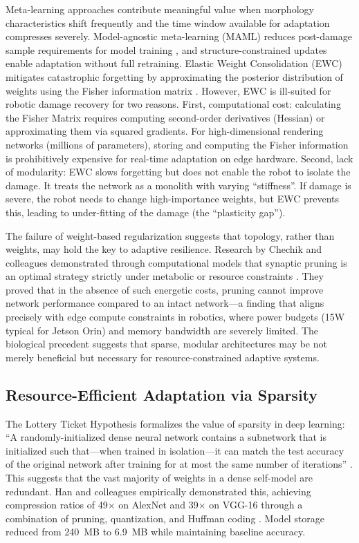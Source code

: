 \documentclass[12pt,a4paper,oneside]{report}
\begin{document}
Meta-learning approaches contribute meaningful value when morphology characteristics shift frequently and the time window available for adaptation compresses severely. Model-agnostic meta-learning (MAML) reduces post-damage sample requirements for model training \cite{finn2017maml}, and structure-constrained updates enable adaptation without full retraining. Elastic Weight Consolidation (EWC) mitigates catastrophic forgetting by approximating the posterior distribution of weights using the Fisher information matrix \cite{kirkpatrick2017overcoming}. However, EWC is ill-suited for robotic damage recovery for two reasons. First, computational cost: calculating the Fisher Matrix requires computing second-order derivatives (Hessian) or approximating them via squared gradients. For high-dimensional rendering networks (millions of parameters), storing and computing the Fisher information is prohibitively expensive for real-time adaptation on edge hardware. Second, lack of modularity: EWC slows forgetting but does not enable the robot to isolate the damage. It treats the network as a monolith with varying ``stiffness''. If damage is severe, the robot needs to change high-importance weights, but EWC prevents this, leading to under-fitting of the damage (the ``plasticity gap'').

The failure of weight-based regularization suggests that topology, rather than weights, may hold the key to adaptive resilience. Research by Chechik and colleagues demonstrated through computational models that synaptic pruning is an optimal strategy strictly under metabolic or resource constraints \cite{chechik1998synaptic}. They proved that in the absence of such energetic costs, pruning cannot improve network performance compared to an intact network---a finding that aligns precisely with edge compute constraints in robotics, where power budgets (15W typical for Jetson Orin) and memory bandwidth are severely limited. The biological precedent suggests that sparse, modular architectures may be not merely beneficial but necessary for resource-constrained adaptive systems.
\subsection{Resource-Efficient Adaptation via Sparsity}
\label{subsec:resource_efficient_adaptation_via_sparsity}

The Lottery Ticket Hypothesis formalizes the value of sparsity in deep learning: ``A randomly-initialized dense neural network contains a subnetwork that is initialized such that---when trained in isolation---it can match the test accuracy of the original network after training for at most the same number of iterations'' \cite{frankle2018lottery}. This suggests that the vast majority of weights in a dense self-model are redundant. Han and colleagues empirically demonstrated this, achieving compression ratios of 49$\times$ on AlexNet and 39$\times$ on VGG-16 through a combination of pruning, quantization, and Huffman coding \cite{han2015deep}. Model storage reduced from 240~MB to 6.9~MB while maintaining baseline accuracy.
\end{document}
